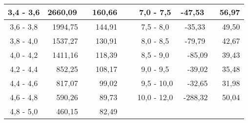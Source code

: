 \begin{table}[]
\begin{tabular}{ | c || r | r ||  l  || c || r | r | }
		3,4 - 3,6 & 2660,09 \ & 160,66 \hspace{3mm} & \ &  7,0 - 7,5 & -47,53 \ & 56,97 \hspace{3mm} \\ \hline
		3,6 - 3,8 & 1994,75 \ & 144,91 \hspace{3mm} & \ &  7,5 - 8,0 & -35,33 \ & 49,50 \hspace{3mm} \\ \hline
		3,8 - 4,0 & 1537,27 \ & 130,91 \hspace{3mm} & \ &  8,0 - 8,5 & -79,79 \ & 42,67 \hspace{3mm} \\ \hline
		4,0 - 4,2 & 1411,16 \ & 118,39 \hspace{3mm} & \ &  8,5 - 9,0 & -85,09 \, & 39,43 \hspace{3mm} \\ \hline
		4,2 - 4,4 & 852,25 \  & 108,17 \hspace{3mm} & \ &  9,0 - 9,5 & -39,02 \, & 35,48 \hspace{3mm} \\ \hline
		4,4 - 4,6 & 817,07 \  & 99,02 \hspace{3mm} &  \ &  \, 9,5 - 10,0 & -32,65 \, & 31,98 \hspace{3mm} \\ \hline
		4,6 - 4,8 & 590,26 \  & 89,73 \hspace{3mm} &  \ &  10,0 - 12,0 & -288,32 \,& 50,04 \hspace{3mm} \\ \hline
		4,8 - 5,0 & 460,15 \  & 82,49 \hspace{3mm} &  \ & \   & \  & \  \\ \hline
	
	\end{tabular}
	
	\caption{}
	\label{}
	
\end{table}